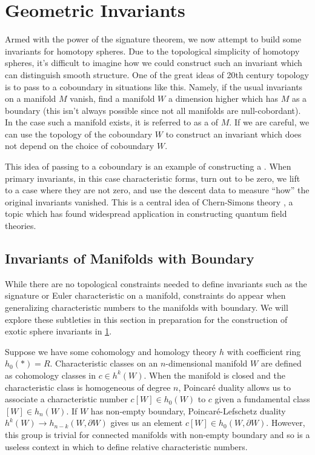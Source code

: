 \pagebreak
\section{Geometric Invariants}\label{sec:invariants-for-homotopy-4k-1-spheres}

Armed with the power of the signature theorem, we now attempt to build some invariants for homotopy spheres.
Due to the topological simplicity of homotopy spheres, it's difficult to imagine how we could construct such an invariant which can distinguish smooth structure. One of the great ideas of 20th century topology is to pass to a coboundary in situations like this. Namely, if the usual invariants on a manifold $M$ vanish, find a manifold $W$ a dimension higher which has $M$ as a boundary (this isn't always possible since not all manifolds are null-cobordant).
In the case such a manifold exists, it is referred to as a  of $M$. If we are careful, we can use the topology of the coboundary $W$ to construct an invariant which does not depend on the choice of coboundary $W$.

\begin{remark}
	This idea of passing to a coboundary is an example of constructing a . When primary invariants, in this case characteristic forms, turn out to be zero, we lift to a case where they are not zero, and use the descent data to measure ``how'' the original invariants vanished. This is a central idea of Chern-Simons theory \cite{chernsimons1974geometric}, a topic which has found widespread application in constructing quantum field theories.
\end{remark}

\subsection{Invariants of Manifolds with Boundary}\label{sec:relative-invariants}

While there are no topological constraints needed to define invariants such as the signature or Euler characteristic on a manifold, constraints do appear when generalizing characteristic numbers to the manifolds with boundary. We will explore these subtleties in this section in preparation for the construction of exotic sphere invariants in \cref{sec:invariants-for-homotopy-4k-1-spheres}.

Suppose we have some cohomology and homology theory $h$ with coefficient ring $h_0(*)=R$.
Characteristic classes on an $n$-dimensional manifold $W$ are defined as cohomology classes in $c\in h^k(W)$. When the manifold is closed and the characteristic class is homogeneous of degree $n$, Poincar\'e duality allows us to associate a characteristic number $c[W]\in h_0(W)$ to $c$ given a fundamental class $[W]\in h_n(W)$. If $W$ has non-empty boundary, Poincar\'e-Lefschetz duality $h^k(W)\to h_{n-k}(W,\partial W)$ gives us an element $c[W]\in h_0(W,\partial W)$. However, this group is trivial for connected manifolds with non-empty boundary and so is a useless context in which to define relative characteristic numbers.

